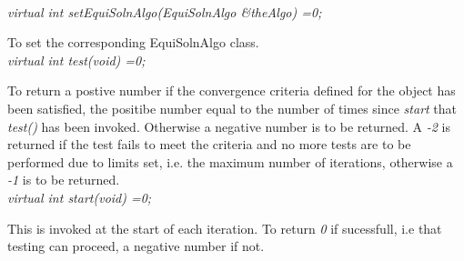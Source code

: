   \\
{\em virtual int setEquiSolnAlgo(EquiSolnAlgo \&theAlgo) =0;} 

To set the corresponding EquiSolnAlgo class. \\

{\em virtual int test(void) =0;} 

To return a postive number if the convergence criteria defined for the
object has been satisfied, the positibe number equal to the number of times 
since {\em start} that {\em test()} has been invoked. Otherwise a negative number 
is to be returned. A {\em -2} 
is returned if the test fails to meet the criteria and no more tests are to be 
performed due to limits set, i.e. the maximum number of iterations, otherwise a
{\em -1} is to be returned.  \\

{\em virtual int start(void) =0;} 

This is invoked at the start of each iteration. To return {\em 0} if sucessfull, i.e 
that testing can proceed, a negative number if not. \\